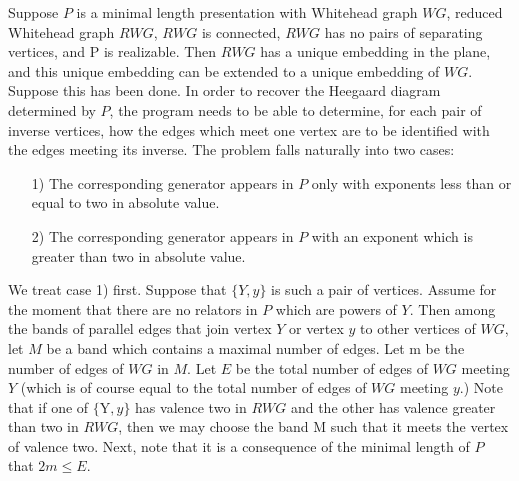 \documentclass[12pt]{amsart}
\begin{document}
                Suppose $P$ is a minimal length presentation with Whitehead graph $WG$, reduced
        Whitehead graph $RWG$, $RWG$ is connected, $RWG$ has no pairs of separating vertices, and
        P is realizable. Then $RWG$ has a unique embedding in the plane, and this unique embedding
        can be extended to a unique embedding of $WG$. Suppose this has been done. In order to
        recover the Heegaard diagram determined by $P$, the program needs to be able to determine,
        for each pair of inverse vertices, how the edges which meet one vertex are to be
        identified with the edges meeting its inverse. The problem falls naturally into two
        cases:
        \begin{enumerate}
        
                \item[1)]      The corresponding generator appears in $P$ only with exponents less than or
                        equal to two in absolute value.
                        
                \item[2)]      The corresponding generator appears in $P$ with an exponent which is greater
                        than two in absolute value.
                     
         \end{enumerate}
                We treat case 1) first. Suppose that $\{ Y,y\}$ is such a pair of vertices. Assume for
        the moment that there are no relators in $P$ which are powers of $Y$. Then among the 
        bands of parallel edges that join vertex $Y$ or vertex $y$ to other vertices of $WG$, let $M$
        be a band which contains a maximal number of edges. Let m be the number of edges of $WG$
        in $M$. Let $E$ be the total number of edges of $WG$ meeting $Y$ (which is of course equal to
        the total number of edges of $WG$ meeting $y$.) Note that if one of $\{ $Y$,y\}$ has valence two
        in $RWG$ and the other has valence greater than two in $RWG$, then we may choose the band
        M such that it meets the vertex of valence two. Next, note that it is a consequence of
        the minimal length of $P$ that $2m \leq E$.
                
\end{document}
